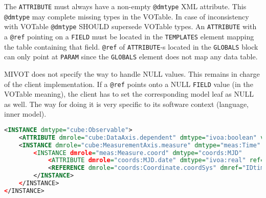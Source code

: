 \begin{enumerate}
    The \texttt{ATTRIBUTE} must always have a non-empty \texttt{@dmtype} XML attribute. 
    This \texttt{@dmtype} may complete missing types in the VOTable. In case of inconsistency with VOTable
    \texttt{@dmtype} SHOULD supersede VOTable types.
    An \texttt{ATTRIBUTE} with a \texttt{@ref} pointing on a \texttt{FIELD} must be located in the \texttt{TEMPLATES} element
    mapping the table containing that field. \texttt{@ref} of \texttt{ATTRIBUTE}-s located in the \texttt{GLOBALS} block can only 
    point at \texttt{PARAM} since the \texttt{GLOBALS} element does not map any data table.
    
\end{enumerate}  
 
 MIVOT does not specify the way to handle NULL values. This remains in charge of the client implementation. 
 If a \texttt{@ref} points onto a NULL \texttt{FIELD} value (in the VOTable meaning), the client has to set the corresponding model leaf 
 as NULL as well. The way for doing it is very specific to its software context (language, inner model).
    
\begin{lstlisting}[caption={Example of \texttt{ATTRIBUTE} set with either a column reference 
or a static value (see line~\ref{ATTRIBUTE_snippet} in Appendix~\ref{appendix_A}).
\texttt{ATTRIBUTE[@dmrole=cube:DataAxis.dependent]} will always be set as  "False" whereas 
\texttt{ATTRIBUTE[@dmrole=coords:MJD.date]} will be set with the value of the \texttt{IDobstime} column. 
},language=XML]
<INSTANCE dmtype="cube:Observable">
    <ATTRIBUTE dmrole="cube:DataAxis.dependent" dmtype="ivoa:boolean" value="False"/>
    <INSTANCE dmrole="cube:MeasurementAxis.measure" dmtype="meas:Time"
        <INSTANCE dmrole="meas:Measure.coord" dmtype="coords:MJD"
            <ATTRIBUTE dmrole="coords:MJD.date" dmtype="ivoa:real" ref="IDobstime"/>
            <REFERENCE dmrole="coords:Coordinate.coordSys" dmref="IDtimesys"/>
        </INSTANCE>
    </INSTANCE>
</INSTANCE>
\end{lstlisting}  


